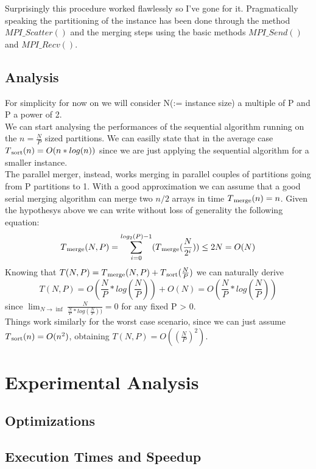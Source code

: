 \documentclass{article}
\begin{document}
Surprisingly this procedure worked flawlessly so I've gone for it. Pragmatically speaking the partitioning of 
the instance has been done through the method $MPI\_Scatter()$ and the merging steps using the basic
methods $MPI\_Send()$ and $MPI\_Recv()$.

\subsection*{Analysis}
For simplicity for now on we will consider N(:= instance size) a multiple of P 
and P a power of 2.\\
We can start analysing the performances of the sequential algorithm running on the 
$n = \frac{N}{P}$ sized partitions. We can easilly state that in the average case
$T\textsubscript{sort}(n) = O(n*log(n))$ since we are just applying the sequential algorithm for a 
smaller instance.\\ 
The parallel merger, instead, works merging in parallel couples of partitions going from P partitions to 1. 
With a good approximation we can assume that a good serial merging algorithm can merge two $n/2$ arrays in time 
$T\textsubscript{merge}(n) = n$.  
Given the hypothesys above we can write without loss of generality the following equation:
\begin{equation}
T\textsubscript{merge}(N,P) =\sum_{i=0}^{log_2(P)-1}(T\textsubscript{merge}(\frac{N}{2^i})) \le 2N = O(N) 
\end{equation}
Knowing that $T(N,P) = T\textsubscript{merge}(N,P) + T\textsubscript{sort}(\frac{N}{P})$ we can naturally derive
\begin{equation}
T(N,P) = O(\frac{N}{P}*log(\frac{N}{P})) + O(N) = O(\frac{N}{P}*log(\frac{N}{P}))
\end{equation}
since $\lim_{N \to \inf}\frac{N}{\frac{N}{P}*log(\frac{N}{P}))} = 0$ for any fixed P > 0. \\
Things work similarly for the worst case scenario, since we can just assume $T\textsubscript{sort}(n) = O(n^2)$, obtaining 
$T(N,P) = O((\frac{N}{P})^2)$.

\section{Experimental Analysis}
\subsection*{Optimizations}
\subsection*{Execution Times and Speedup}
\end{document}

